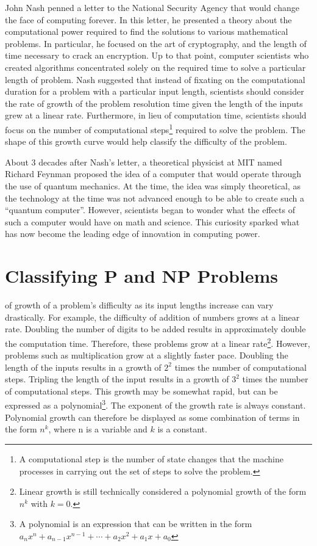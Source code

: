 \documentclass[10pt,journal,compsoc]{IEEEtran}
\begin{document}
 John Nash penned a letter to the National Security Agency that would change the face of computing forever\cite{NSA}. 
In this letter, he presented a theory about the computational power required to find the solutions to various mathematical problems. In particular, he focused on the art of cryptography, and the length of time necessary to crack an encryption. Up to that point, computer scientists who created algorithms concentrated solely on the required time to solve a particular length of problem. Nash suggested that instead of fixating on the computational duration for a problem with a particular input length, scientists should consider the rate of growth of the problem resolution time given the length of the inputs grew at a linear rate. Furthermore, in lieu of computation time, scientists should focus on the number of computational steps\footnote{A computational step is the number of state changes that the machine processes  in carrying out the set of steps to solve the problem.} required to solve the problem.  The shape of this growth curve would help classify the difficulty of the problem. 

About 3 decades after Nash's letter, a theoretical physicist at MIT named Richard Feynman proposed the idea of a computer that would operate through the use of quantum mechanics. At the time, the idea was simply theoretical, as the technology at the time was not advanced enough to be able to create such a ``quantum computer''. However, scientists began to wonder what the effects of such a computer would have on math and science. This curiosity sparked what has now become the leading edge of innovation in computing power. 


\section{Classifying P and NP Problems}
 of growth of a problem's difficulty as its input lengths increase can vary drastically. For example, the difficulty of addition of numbers grows at a linear rate. Doubling the number of digits to be added results in approximately double the computation time. Therefore, these problems grow at a linear rate\footnote{Linear growth is still technically considered a polynomial growth of the form $n^k$ with $k=0$.}.  However, problems such as multiplication grow at a slightly faster pace. Doubling the length of the inputs results in a growth of $2^2$ times the number of computational steps. Tripling the length of the input  results in a growth of $3^2$ times the number of computational steps. This growth may be somewhat rapid, but can be expressed as a polynomial\footnote{A polynomial is an expression that can be written in the form $a_{n}x^{n}+a_{n-1}x^{n-1}+\dotsb +a_{2}x^{2}+a_{1}x+a_{0}$ }. The exponent of the growth rate is always constant. Polynomial growth can therefore be displayed as some combination of terms in the form $n^k$, where n is a variable and $k$ is a constant.
\end{document}

